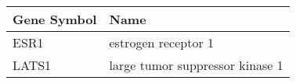 \begin{tabular}{ll}
\toprule
Gene Symbol &                            Name \\
\midrule
       ESR1 &             estrogen receptor 1 \\
      LATS1 & large tumor suppressor kinase 1 \\
\bottomrule
\end{tabular}
